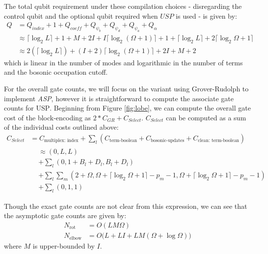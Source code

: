 The total qubit requirement under these compilation choices - disregarding the control qubit and the optional qubit required when $USP$ is used - is given by:
\begin{equation}
    \begin{split}
        Q &= Q_{\textit{index}} + 1 + Q_{\textit{coeff}} + Q_{\psi_b} + Q_{\psi_d} + Q_{\psi_a} + Q_\alpha \\
        &\approx \lceil \log_2{L} \rceil + 1 + M + 2I + I\lceil \log_2{(\Omega + 1)} \rceil + 1 + \lceil \log_2{L} \rceil + 2 \lceil \log_2{\Omega + 1} \rceil \\
        &\approx 2(\lceil \log_2{L} \rceil) + (I + 2)\lceil \log_2{(\Omega + 1)} \rceil + 2I + M + 2
    \end{split}
\end{equation}
which is linear in the number of modes and logarithmic in the number of terms and the bosonic occupation cutoff.

For the overall gate counts, we will focus on the variant using Grover-Rudolph to implement \textit{ASP}, however it is straightforward to compute the associate gate counts for $\text{USP}$.
Beginning from Figure \ref{fig:lobe}, we can compute the overall gate cost of the block-encoding as $2*C_{GR} + C_{\textit{Select}}$.
$C_{\textit{Select}}$ can be computed as a sum of the individual costs outlined above:
\begin{equation}
    \begin{split}
        C_{\textit{Select}} &= C_{\text{multiplex: index}} + \sum_l (C_{\text{term-boolean}} + C_\text{bosonic-updates} + C_{\text{clean: term-boolean}}) \\
        &\begin{split}
            &\approx (0, L, L) \\
            &+ \sum_l (0, 1 + B_l + D_l, B_l + D_l) \\
            &+ \sum_l \sum_m (2 + \Omega, \Omega + \lceil \log_2{\Omega + 1} \rceil - p_m - 1, \Omega + \lceil \log_2{\Omega + 1} \rceil - p_m - 1) \\
            &+ \sum_l (0, 1, 1) \\ 
        \end{split} \\
    \end{split}
\end{equation}
Though the exact gate counts are not clear from this expression, we can see that the asymptotic gate counts are given by:
\begin{equation}
\begin{split}
    N_\text{rot} &= O(LM \Omega) \\
    N_\text{elbow} &= O\big(L + LI + LM(\Omega + \log{\Omega}) \big)
\end{split}
\end{equation}
where $M$ is upper-bounded by $I$.

